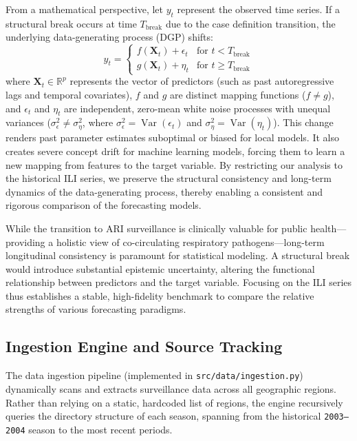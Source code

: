 From a mathematical perspective, let $y_t$ represent the observed time series. If a structural break occurs at time $T_{\text{break}}$ due to the case definition transition, the underlying data-generating process (DGP) shifts:
\begin{equation}
y_t = \begin{cases}
f(\mathbf{X}_t) + \epsilon_t & \text{for } t < T_{\text{break}} \\
g(\mathbf{X}_t) + \eta_t & \text{for } t \ge T_{\text{break}}
\end{cases}
\end{equation}
where $\mathbf{X}_t \in \mathbb{R}^p$ represents the vector of predictors (such as past autoregressive lags and temporal covariates), $f$ and $g$ are distinct mapping functions ($f \neq g$), and $\epsilon_t$ and $\eta_t$ are independent, zero-mean white noise processes with unequal variances ($\sigma_{\epsilon}^2 \neq \sigma_{\eta}^2$, where $\sigma_{\epsilon}^2 = \operatorname{Var}(\epsilon_t)$ and $\sigma_{\eta}^2 = \operatorname{Var}(\eta_t)$). This change renders past parameter estimates suboptimal or biased for local models. It also creates severe concept drift for machine learning models, forcing them to learn a new mapping from features to the target variable. By restricting our analysis to the historical ILI series, we preserve the structural consistency and long-term dynamics of the data-generating process, thereby enabling a consistent and rigorous comparison of the forecasting models.

While the transition to ARI surveillance is clinically valuable for public health---providing a holistic view of co-circulating respiratory pathogens---long-term longitudinal consistency is paramount for statistical modeling. A structural break would introduce substantial epistemic uncertainty, altering the functional relationship between predictors and the target variable. Focusing on the ILI series thus establishes a stable, high-fidelity benchmark to compare the relative strengths of various forecasting paradigms.

\subsection{Ingestion Engine and Source Tracking}
The data ingestion pipeline (implemented in \texttt{src/data/ingestion.py}) dynamically scans and extracts surveillance data across all geographic regions. Rather than relying on a static, hardcoded list of regions, the engine recursively queries the directory structure of each season, spanning from the historical \texttt{2003--2004} season to the most recent periods.

